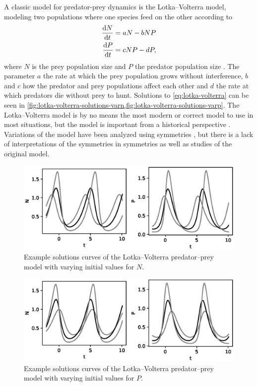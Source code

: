 A classic model for predator-prey dynamics is the Lotka--Volterra model, modeling two populations where one species feed on the other according to
\begin{subequations} \label{eq:lotka-volterra}
  \begin{align}
    \diff{N}{t} &= a N - b N P\\
    \diff{P}{t} &= c N P - d P,
  \end{align}
\end{subequations}
where \(N\) is the prey population size and \(P\) the predator population size \cite{lotka1925elements,volterra1928variations}.
The parameter \(a\) the rate at which the prey population grows without interference, \(b\) and \(c\) how the predator and prey populations affect each other and \(d\) the rate at which predators die without prey to hunt.
Solutions to \cref{eq:lotka-volterra} can be seen in \cref{fig:lotka-volterra-solutions-varn,fig:lotka-volterra-solutions-varp}.
The Lotka--Volterra model is by no means the most modern or correct model to use in most situations, but the model is important from a historical perspective \cite{berryman1992orgins}.
Variations of the model have been analyzed using symmetries \cite{almeida1995lie,cherniha2004diffusive}, but there is a lack of interpretations of the symmetries in symmetries as well as studies of the original model. %
\begin{figure}
  \centering
  \includegraphics[width=.96\textwidth]{images/lotka-volterra-solutions-varn}
  \caption{Example solutions curves of the Lotka--Volterra predator--prey model with varying initial values for \(N\).}
  \label{fig:lotka-volterra-solutions-varn}
\end{figure}
\begin{figure}
  \centering
  \includegraphics[width=.96\textwidth]{images/lotka-volterra-solutions-varp}
  \caption{Example solutions curves of the Lotka--Volterra predator--prey model with varying initial values for \(P\).}
  \label{fig:lotka-volterra-solutions-varp}
\end{figure}

